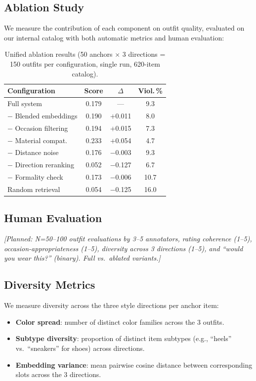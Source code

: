 \documentclass[10pt,twocolumn]{article}
\begin{document}
\subsection{Ablation Study}

We measure the contribution of each component on outfit quality, evaluated
on our internal catalog with both automatic metrics and human evaluation:

\begin{table}[h]
\centering
\small
\caption{Unified ablation results (50 anchors $\times$ 3 directions = 150
outfits per configuration, single run, 620-item catalog).}
\label{tab:ablation}
\begin{tabular}{lccc}
\toprule
Configuration & Score & $\Delta$ & Viol.\,\% \\
\midrule
Full system              & 0.179 & ---      &  9.3 \\
$-$ Blended embeddings   & 0.190 & $+$0.011 &  8.0 \\
$-$ Occasion filtering   & 0.194 & $+$0.015 &  7.3 \\
$-$ Material compat.     & 0.233 & $+$0.054 &  4.7 \\
$-$ Distance noise       & 0.176 & $-$0.003 &  9.3 \\
$-$ Direction reranking  & 0.052 & $-$0.127 &  6.7 \\
$-$ Formality check      & 0.173 & $-$0.006 & 10.7 \\
\midrule
Random retrieval         & 0.054 & $-$0.125 & 16.0 \\
\bottomrule
\end{tabular}
\end{table}

\subsection{Human Evaluation}

\textit{[Planned: N=50--100 outfit evaluations by 3--5 annotators, rating
coherence (1--5), occasion-appropriateness (1--5), diversity across 3
directions (1--5), and ``would you wear this?'' (binary).  Full vs.\
ablated variants.]}

\subsection{Diversity Metrics}

We measure diversity across the three style directions per anchor item:

\begin{itemize}[leftmargin=*,topsep=2pt,itemsep=1pt]
\item \textbf{Color spread}: number of distinct color families across the
  3 outfits.
\item \textbf{Subtype diversity}: proportion of distinct item subtypes
  (e.g., ``heels'' vs.\ ``sneakers'' for shoes) across directions.
\item \textbf{Embedding variance}: mean pairwise cosine distance between
  corresponding slots across the 3 directions.
\end{itemize}
\end{document}
